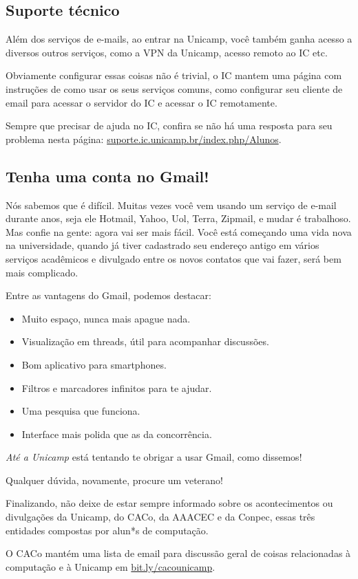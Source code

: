 \subsection{Suporte técnico}

Além dos serviços de e-mails, ao entrar na Unicamp, você também ganha acesso a
diversos outros serviços, como a VPN da Unicamp, acesso remoto ao IC etc.

Obviamente configurar essas coisas não é trivial, o IC mantem uma página com
instruções de como usar os seus serviços comuns, como configurar seu cliente de
email para acessar o servidor do IC e acessar o IC remotamente.

Sempre que precisar de ajuda no IC, confira se não há uma resposta para seu
problema nesta página: \url{suporte.ic.unicamp.br/index.php/Alunos}.


\subsection{Tenha uma conta no Gmail!}

Nós sabemos que é difícil. Muitas vezes você vem usando um serviço de e-mail
durante anos, seja ele Hotmail, Yahoo, Uol, Terra, Zipmail, e mudar é
trabalhoso.  Mas confie na gente: agora vai ser mais fácil. Você está começando
uma vida nova na universidade, quando já tiver cadastrado seu endereço antigo em
vários serviços acadêmicos e divulgado entre os novos contatos que vai fazer,
será bem mais complicado.

Entre as vantagens do Gmail, podemos destacar:

\begin{itemize}
    \item Muito espaço, nunca mais apague nada.
    \item Visualização em threads, útil para acompanhar discussões.
    \item Bom aplicativo para smartphones.
    \item Filtros e marcadores infinitos para te ajudar.
    \item Uma pesquisa que funciona.
    \item Interface mais polida que as da concorrência.
\end{itemize}

\emph{Até a Unicamp} está tentando te obrigar a usar Gmail, como dissemos!
\normalsize\shrug

Qualquer dúvida, novamente, procure um veterano!

Finalizando, não deixe de estar sempre informado sobre os acontecimentos ou
divulgações da Unicamp, do CACo, da AAACEC e da Conpec, essas três entidades
compostas por alun*s de computação.

O CACo mantém uma lista de email para discussão geral de coisas relacionadas à
computação e à Unicamp em
\url{bit.ly/cacounicamp}.


